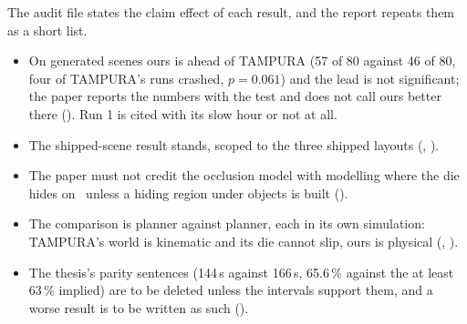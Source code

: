 The audit file states the claim effect of each result, and the report repeats them
as a short list.
\begin{itemize}
  \item On generated scenes ours is ahead of TAMPURA (57 of 80 against 46 of 80, four
  of TAMPURA's runs crashed, $p = 0.061$) and the lead is not significant; the paper
  reports the numbers with the test and does not call ours better there (). Run 1
  is cited with its slow hour or not at all. 
  \item The shipped-scene result stands, scoped to the three shipped layouts
  (, ).
  \item The paper must not credit the occlusion model with modelling where the die
  hides on \fdice\ unless a hiding region under objects is built ().
  \item The comparison is planner against planner, each in its own simulation:
  TAMPURA's world is kinematic and its die cannot slip, ours is physical
  (, ).
  \item The thesis's parity sentences (144\,s against 166\,s, 65.6\,\% against the
  at least 63\,\% implied) are to be deleted unless the intervals support them, and
  a worse result is to be written as such ().
\end{itemize}
